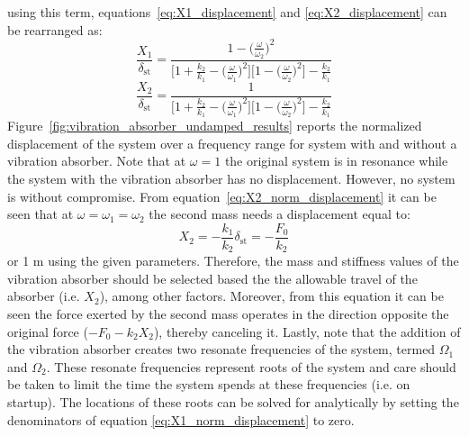 \documentclass[12pt,letter]{article}
\numberwithin{ex}{section} %
\numberwithin{re}{section} %
\begin{document}
using this term, equations~\ref{eq:X1_displacement} and \ref{eq:X2_displacement} can be rearranged as:
\begin{equation}
\frac{X_1}{\delta_{\text{st}}} = \frac{1 - \big(\frac{\omega}{\omega_2} \big)^2 }{\Big[1 + \frac{k_2}{k_1} - \big(\frac{\omega}{\omega_1} \big)^2 \Big] \Big[ 1- \big(\frac{\omega}{\omega_2} \big)^2 \Big] -\frac{k_2}{k_1}}
\label{eq:X1_norm_displacement}
\end{equation}
\begin{equation}
\frac{X_2}{\delta_{\text{st}}} = \frac{1}{\Big[1 + \frac{k_2}{k_1} - \big(\frac{\omega}{\omega_1} \big)^2 \Big] \Big[ 1- \big(\frac{\omega}{\omega_2} \big)^2 \Big] -\frac{k_2}{k_1}}
\label{eq:X2_norm_displacement}
\end{equation}
Figure~\ref{fig:vibration_absorber_undamped_results} reports the normalized displacement of the system over a frequency range for system with and without a vibration absorber. Note that at $\omega=1$ the original system is in resonance while the system with the vibration absorber has no displacement. However, no system is without compromise. From equation~\ref{eq:X2_norm_displacement} it can be seen that at $\omega = \omega_1 = \omega_2$ the second mass needs a displacement equal to:
\begin{equation}
X_2 = -\frac{k_1}{k_2}\delta_{\text{st}} = -\frac{F_0}{k_2}
\end{equation}
or 1 m using the given parameters. Therefore, the mass and stiffness values of the vibration absorber should be selected based the the allowable travel of the absorber (i.e. $X_2$), among other factors. Moreover, from this equation it can be seen the force exerted by the second mass operates in the direction opposite the original force ($-F_0 - k_2 X_2$), thereby canceling it. Lastly, note that the addition of the vibration absorber creates two resonate frequencies of the system, termed $\Omega_1$ and $\Omega_2$. These  resonate frequencies represent roots of the system and care should be taken to limit the time the system spends at these frequencies (i.e. on startup). The locations of these roots can be solved for analytically by setting the denominators of equation \ref{eq:X1_norm_displacement} to zero.
\end{document}
